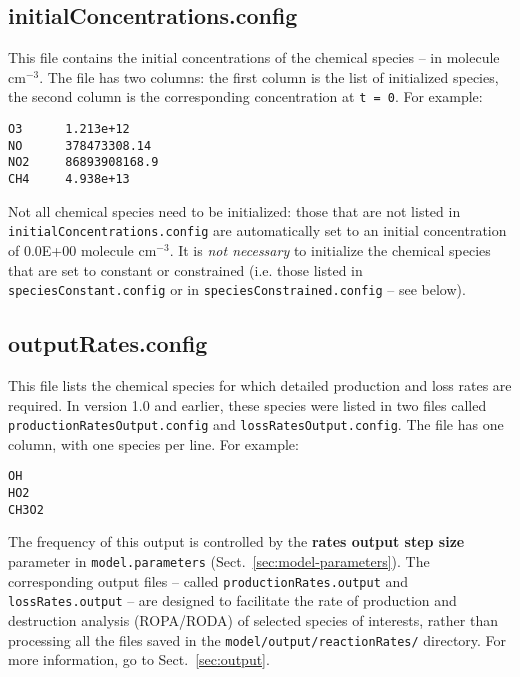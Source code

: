 \subsection{initialConcentrations.config} \label{subsec:initialconcentrations}

This file contains the initial concentrations of the chemical species
-- in molecule cm$^{-3}$. The file has two columns: the first column
is the list of initialized species, the second column is the
corresponding concentration at \texttt{t\ =\ 0}. For example:

\begin{verbatim}
O3      1.213e+12
NO      378473308.14
NO2     86893908168.9
CH4     4.938e+13
\end{verbatim}

Not all chemical species need to be initialized: those that are not
listed in \texttt{initialConcentrations.config} are automatically set
to an initial concentration of 0.0E+00 molecule cm$^{-3}$. It is
\emph{not necessary} to initialize the chemical species that are set
to constant or constrained (i.e. those listed in
\texttt{speciesConstant.config} or in \texttt{speciesConstrained.config}
-- see below).

\subsection{outputRates.config} \label{subsec:outputrates}

This file lists the chemical species for which detailed production and
loss rates are required. In version 1.0 and earlier, these species
were listed in two files called \texttt{productionRatesOutput.config}
and \texttt{lossRatesOutput.config}. The file has one column, with one
species per line. For example:

\begin{verbatim}
OH
HO2
CH3O2
\end{verbatim}

The frequency of this output is controlled by the \textbf{rates output
  step size} parameter in \texttt{model.parameters}
(Sect.~\ref{sec:model-parameters}). The corresponding output files --
called \texttt{productionRates.output} and \texttt{lossRates.output}
-- are designed to facilitate the rate of production and destruction
analysis (ROPA/RODA) of selected species of interests, rather than
processing all the files saved in the \texttt{model/output/reactionRates/}
directory. For more information, go to Sect.~\ref{sec:output}.


